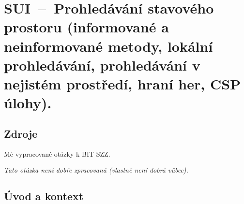 

\graphicspath{{sui/prohledavani_stavoveho_prostoru/figures}}


\chapter{SUI~--~Prohledávání stavového prostoru (informované a neinformované metody, lokální prohledávání, prohledávání v nejistém prostředí, hraní her, CSP úlohy).}


\section{Zdroje}

\begin{compactitem}
    \item {}
    \item {}
    \item {}
    \item Mé vypracované otázky k BIT SZZ.
\end{compactitem}

\textit{Tato otázka není dobře zpracovaná (vlastně není dobrá vůbec).}


\section{Úvod a kontext}

